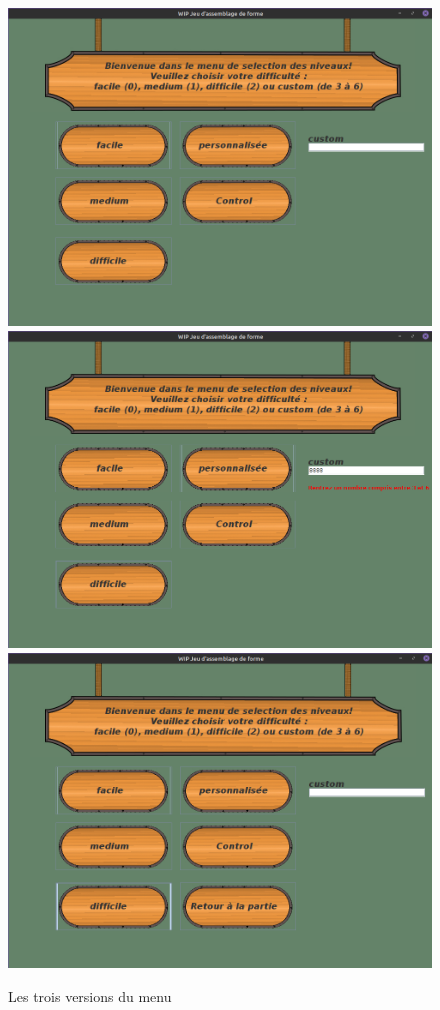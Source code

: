 \documentclass[12pt]{article}
\begin{document}
\begin{figure}[h]
\begin{center}
\includegraphics[scale=0.125]{Images/Menu1.png}
\includegraphics[scale=0.125]{Images/menu2.png}
\includegraphics[scale=0.125]{Images/Menu3.png}
\end{center}
\caption{Les trois versions du menu}
\end{figure}
\end{document}
